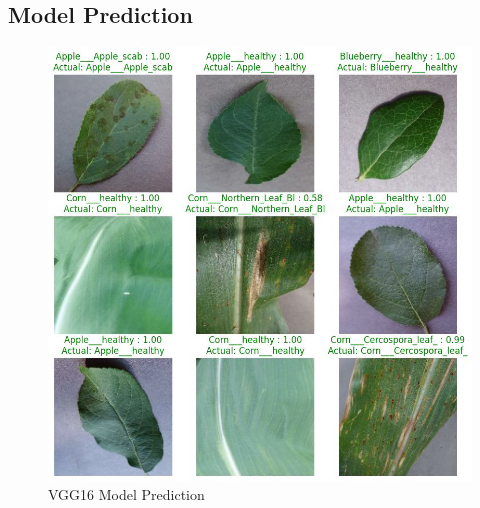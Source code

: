 \subsection{Model Prediction}

\begin{figure}
    \centering
    \includegraphics[width=1\linewidth]{graphics//chapter6/vgg prediction0.png}
    \caption{VGG16 Model Prediction}
    \label{fig:vgg-prediction0}
\end{figure}

